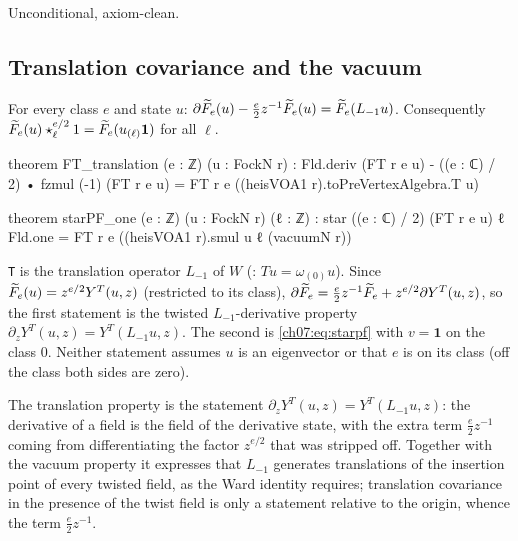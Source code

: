 \begin{status}
Unconditional, axiom-clean.
\end{status}

\subsection{Translation covariance and the vacuum}

\begin{theorem}\label{ch07:thm:translation}
For every class $e$ and state $u$:
$\partial\widetilde{F}_e(u) - \frac e2z^{-1}\widetilde{F}_e(u) = \widetilde{F}_e(L_{-1}u)$. Consequently
$\widetilde{F}_e(u)\star^{e/2}_\ell1 = \widetilde{F}_e(u_{(\ell)}\mathbf 1)$ for all $\ell$.
\end{theorem}

\begin{leancode}
theorem FT_translation (e : ℤ) (u : FockN r) :
    Fld.deriv (FT r e u) - ((e : ℂ) / 2) • fzmul (-1) (FT r e u)
      = FT r e ((heisVOA1 r).toPreVertexAlgebra.T u)

theorem starPF_one (e : ℤ) (u : FockN r) (ℓ : ℤ) :
    star ((e : ℂ) / 2) (FT r e u) ℓ Fld.one = FT r e ((heisVOA1 r).smul u ℓ (vacuumN r))
\end{leancode}

\begin{dictionary}
\verb|T| is the translation operator $L_{-1}$ of $W$ (: $Tu =
\omega_{(0)}u$). Since $\widetilde{F}_e(u) = z^{e/2}Y^T(u,z)$ (restricted to its class),
$\partial\widetilde{F}_e = \frac e2z^{-1}\widetilde{F}_e + z^{e/2}\partial Y^T(u,z)$, so the first
statement is the twisted $L_{-1}$-derivative property $\partial_zY^T(u,z) = Y^T(L_{-1}u,z)$. The
second is \eqref{ch07:eq:starpf} with $v = \mathbf 1$ on the class $0$. Neither statement
assumes $u$ is an eigenvector or that $e$ is on its class (off the class both sides are zero).
\end{dictionary}

\begin{physics}
The translation property is the statement $\partial_zY^T(u,z)=Y^T(L_{-1}u,z)$: the derivative of a field is the field of the derivative state, with the extra term $\tfrac e2z^{-1}$ coming from differentiating the factor $z^{e/2}$ that was stripped off. Together with the vacuum property it expresses that $L_{-1}$ generates translations of the insertion point of every twisted field, as the Ward identity requires; translation covariance in the presence of the twist field is only a statement relative to the origin, whence the term $\tfrac e2z^{-1}$.
\end{physics}

